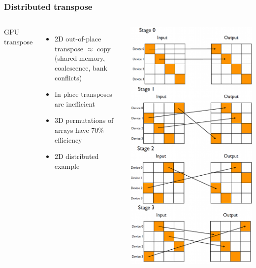 \documentclass{beamer}
\begin{document}
\begin{frame}
\frametitle{Distributed transpose}
\begin{columns}
GPU transpose
\begin{itemize}
\item 2D out-of-place transpose $\approx$ copy \\
      \small{(shared memory, coalescence, bank conflicts)}
\item In-place transposes are inefficient
\item 3D permutations of arrays have 70\% efficiency
\item 2D distributed example
\end{itemize}

\includegraphics[width=\textwidth]{transpose.png}
\end{columns}
\end{frame}
\end{document}
